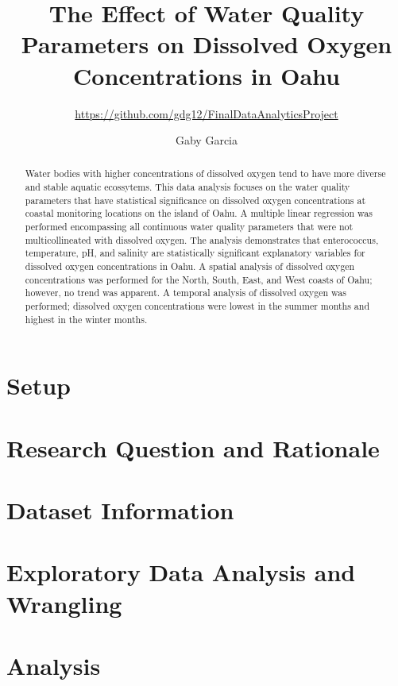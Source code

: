 \documentclass[12pt,]{article}
\title{The Effect of Water Quality Parameters on Dissolved Oxygen
Concentrations in Oahu}
\subtitle{\url{https://github.com/gdg12/FinalDataAnalyticsProject}}
\author{Gaby Garcia}
\date{}
\begin{document}
\maketitle
\begin{abstract}
Water bodies with higher concentrations of dissolved oxygen tend to have
more diverse and stable aquatic ecossytems. This data analysis focuses
on the water quality parameters that have statistical significance on
dissolved oxygen concentrations at coastal monitoring locations on the
island of Oahu. A multiple linear regression was performed encompassing
all continuous water quality parameters that were not multicollineated
with dissolved oxygen. The analysis demonstrates that enterococcus,
temperature, pH, and salinity are statistically significant explanatory
variables for dissolved oxygen concentrations in Oahu. A spatial
analysis of dissolved oxygen concentrations was performed for the North,
South, East, and West coasts of Oahu; however, no trend was apparent. A
temporal analysis of dissolved oxygen was performed; dissolved oxygen
concentrations were lowest in the summer months and highest in the
winter months.
\end{abstract}

\tableofcontents 

\section{Setup}\label{setup}

\section{Research Question and
Rationale}\label{research-question-and-rationale}

\section{Dataset Information}\label{dataset-information}

\section{Exploratory Data Analysis and
Wrangling}\label{exploratory-data-analysis-and-wrangling}

\section{Analysis}\label{analysis}
\end{document}
